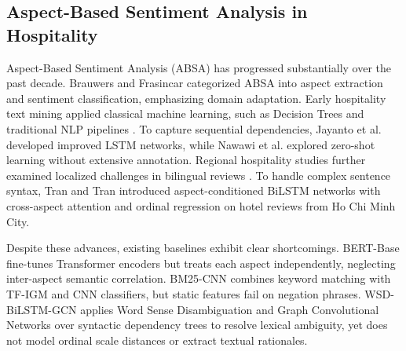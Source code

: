 \documentclass{llncs}
\begin{document}
\subsection{Aspect-Based Sentiment Analysis in Hospitality}
\label{subsec:rw_absa_hospitality}
Aspect-Based Sentiment Analysis (ABSA) has progressed substantially over the past decade. Brauwers and Frasincar \cite{ref18_brauwers2022} categorized ABSA into aspect extraction and sentiment classification, emphasizing domain adaptation. Early hospitality text mining applied classical machine learning, such as Decision Trees \cite{ref07_apriliani2020} and traditional NLP pipelines \cite{ref08_ounacer2023}. To capture sequential dependencies, Jayanto et al. \cite{ref29_jayanto2022} developed improved LSTM networks, while Nawawi et al. \cite{ref05_nawawi2024} explored zero-shot learning without extensive annotation. Regional hospitality studies further examined localized challenges in bilingual reviews \cite{ref10_nguyen2023,ref25_le2026}. To handle complex sentence syntax, Tran and Tran \cite{ref30_tran2026} introduced aspect-conditioned BiLSTM networks with cross-aspect attention and ordinal regression on hotel reviews from Ho Chi Minh City.

Despite these advances, existing baselines exhibit clear shortcomings. BERT-Base \cite{ref01_bimaputra2023} fine-tunes Transformer encoders but treats each aspect independently, neglecting inter-aspect semantic correlation. BM25-CNN \cite{ref04_namee2023} combines keyword matching with TF-IGM and CNN classifiers, but static features fail on negation phrases. WSD-BiLSTM-GCN \cite{ref09_nadeem2025} applies Word Sense Disambiguation and Graph Convolutional Networks over syntactic dependency trees to resolve lexical ambiguity, yet does not model ordinal scale distances or extract textual rationales.
\end{document}

